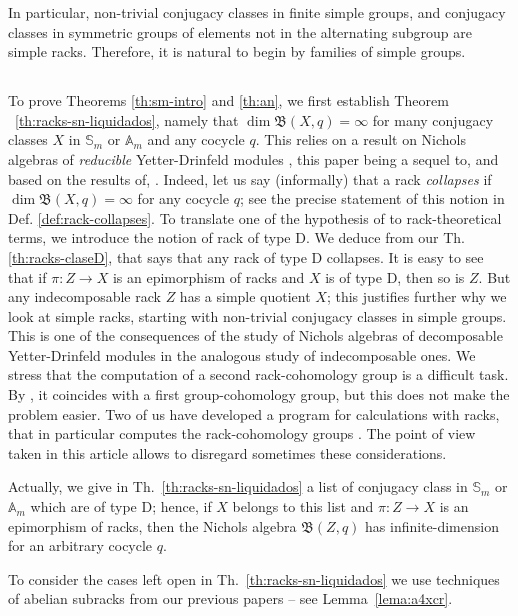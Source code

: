 \documentclass[11pt]{amsart} \textheight 22cm
\renewcommand{\^}[1]{\mbox{$^{\left( #1 \right)}$}}
\renewcommand{\_}[1]{\mbox{$_{\left( #1 \right)}$}}
\newcommand\toba{{\mathfrak B }}
\theoremstyle{plain}
\theoremstyle{definition}
\theoremstyle{remark}
\newcommand\am{\mathbb A_m}
\newcommand\sm{\mathbb S_m}
\theoremstyle{remark}
\begin{document}
In particular, non-trivial conjugacy classes in finite simple
groups, and conjugacy classes in symmetric groups of elements not
in the alternating subgroup are simple racks.
Therefore, it is natural to begin by families of simple groups.

\medbreak\subsection{} To prove Theorems \ref{th:sm-intro} and
\ref{th:an}, we first establish Theorem
~\ref{th:racks-sn-liquidados}, namely that $\dim \toba(X,q) =
\infty$ for many conjugacy classes $X$ in $\sm$ or $\am$ and any
cocycle $q$. This relies on a result on Nichols algebras of
\emph{reducible} Yetter-Drinfeld modules \cite[Th. 8.6]{HS1}, this paper being a sequel to, and based on the results of, \cite{AHS}.
Indeed, let us say (informally) that a rack \emph{collapses} if
$\dim \toba(X,q) = \infty$ for any cocycle $q$; see the precise
statement of this notion in Def. \ref{def:rack-collapses}. To
translate one of the hypothesis of \cite[Th.8.6]{HS1} to
rack-theoretical terms, we introduce the notion of rack of type D.
We deduce from \cite[Th.8.6]{HS1} our Th. \ref{th:racks-claseD},
that says that any rack of type D collapses. It is easy to see
that if $\pi: Z \to X$ is an epimorphism of racks and $X$ is of
type D, then so is $Z$. But any indecomposable rack $Z$ has a
simple quotient $X$; this justifies further why we look at simple
racks, starting with non-trivial conjugacy classes in simple
groups. This is one of the consequences of the study of Nichols
algebras of decomposable Yetter-Drinfeld modules in the analogous
study of indecomposable ones. We stress that the computation of a
second rack-cohomology group is a difficult task. By \cite{EG}, it
coincides with a first group-cohomology group, but this does not
make the problem easier. Two of us have developed a program for
calculations with racks, that in particular computes the
rack-cohomology groups \cite{GV}. The point of view taken in this
article allows to disregard sometimes these considerations.

\medbreak
Actually, we give in Th.~\ref{th:racks-sn-liquidados} a
list of conjugacy class in $\sm$ or $\am$ which are of type D;
hence, if $X$ belongs
to this list and $\pi: Z \to X$ is an epimorphism of racks, then the Nichols algebra
$\toba(Z,q)$ has infinite-dimension for an arbitrary cocycle $q$.




\medbreak To consider the cases left open in
Th.~\ref{th:racks-sn-liquidados} we use
techniques of abelian subracks from our previous papers -- see Lemma~\ref{lema:a4xcr}.
\end{document}
